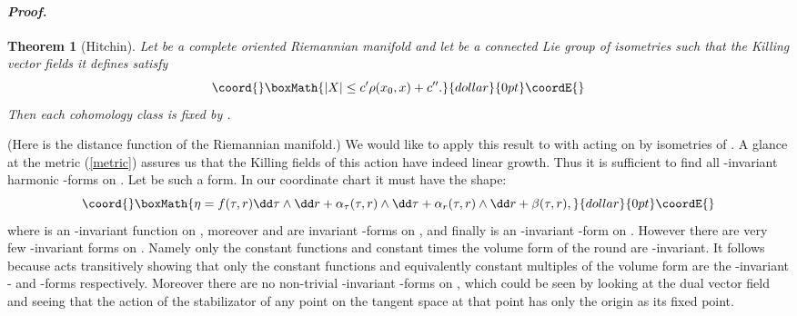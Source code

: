\documentclass[a4paper,12pt,draft]{article}
\newtheorem{theorem}{Theorem}[section]
\newenvironment{proof}{\paragraph{\it Proof.}}{\myHighlight{$\square$}\coordHE{}\vskip0.4cm}
\begin{document}
\begin{proof}
\begin{theorem}[Hitchin] Let \coordHE{} be a complete oriented Riemannian manifold
and let \coordHE{} be a connected Lie group of isometries such that the Killing 
vector fields \coordHE{} it defines satisfy $$\coord{}\boxMath{\vert X\vert\leq c^\prime
\rho(x_0,x)+ c^{\prime\prime}.}{dollar}{0pt}\coordE{}$$ Then each \coordHE{} cohomology class is fixed
by \coordHE{}.
\end{theorem}
(Here \myHighlight{$\rho$}\coordHE{} is the distance function of the Riemannian manifold.)
We would like to apply this result to \coordHE{} with \coordHE{} acting on \coordHE{} 
by isometries of \coordHE{}. A glance at the metric (\ref{metric}) assures us
that the Killing fields of this action have indeed linear growth. 
Thus it is sufficient to  
find all \coordHE{}-invariant harmonic \coordHE{}-forms on \coordHE{}. Let \myHighlight{$\eta$}\coordHE{} be such
a form. In our coordinate chart \coordHE{} it  must have the shape: 
$$\coord{}\boxMath{\eta=f(\tau, r)\dd\tau\wedge\dd r + \alpha_\tau (\tau ,r)\wedge\dd\tau +
\alpha_r(\tau ,r)\wedge\dd r +\beta (\tau ,r),}{dollar}{0pt}\coordE{}$$ 
where \coordHE{} is an \coordHE{}-invariant function on \coordHE{}, moreover 
\coordHE{} and \coordHE{} are \coordHE{} invariant
\coordHE{}-forms on \coordHE{}, and
finally \coordHE{} is an \coordHE{}-invariant \coordHE{}-form on \coordHE{}.
However there are very few \coordHE{}-invariant forms on \coordHE{}.
Namely only the constant functions and constant times the volume form of the 
round \coordHE{} are \coordHE{}-invariant. It follows because \coordHE{} acts 
transitively showing that only the constant functions and equivalently 
constant multiples of the volume form are the \coordHE{}-invariant \coordHE{}- and 
\coordHE{}-forms respectively. Moreover there are no non-trivial
\coordHE{}-invariant \coordHE{}-forms on \coordHE{}, which could be seen by looking at
the dual vector field and seeing that the action of the \coordHE{}
stabilizator of any point on the tangent space at that point has only 
the origin as its fixed point. 


\end{proof}
\end{document}
